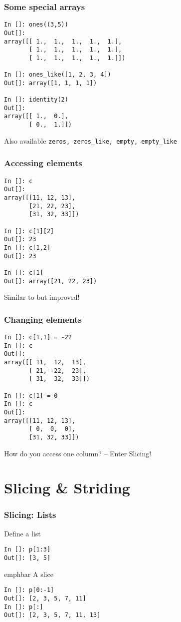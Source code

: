 \documentclass[14pt,compress]{beamer}
\newcommand{\emphbar}[1]
{\begin{beamercolorbox}[rounded=true]{emphbar} 
      {#1}
 \end{beamercolorbox}
}
\newcommand{\typ}[1]{\lstinline{#1}}
\newcommand{\kwrd}[1]{ \texttt{\textbf{\color{blue}{#1}}}  }
\begin{document}
\begin{frame}[fragile]
\frametitle{Some special arrays}
\begin{small}
  \begin{lstlisting}
In []: ones((3,5))
Out[]: 
array([[ 1.,  1.,  1.,  1.,  1.],
       [ 1.,  1.,  1.,  1.,  1.],
       [ 1.,  1.,  1.,  1.,  1.]])

In []: ones_like([1, 2, 3, 4]) 
Out[]: array([1, 1, 1, 1])   

In []: identity(2)
Out[]: 
array([[ 1.,  0.],
       [ 0.,  1.]])
  \end{lstlisting}
Also available \alert{\typ{zeros, zeros_like, empty, empty_like}}
\end{small}
\end{frame}


\begin{frame}[fragile]
  \frametitle{Accessing elements}
  \begin{small}
  \begin{lstlisting}
In []: c
Out[]: 
array([[11, 12, 13],
       [21, 22, 23],
       [31, 32, 33]])

In []: c[1][2]
Out[]: 23
In []: c[1,2]
Out[]: 23

In []: c[1]
Out[]: array([21, 22, 23])
  \end{lstlisting}
  \end{small}
Similar to \kwrd{lists} but improved!
\end{frame}

\begin{frame}[fragile]
  \frametitle{Changing elements}
  \begin{small}
  \begin{lstlisting}
In []: c[1,1] = -22
In []: c
Out[]: 
array([[ 11,  12,  13],
       [ 21, -22,  23],
       [ 31,  32,  33]])

In []: c[1] = 0
In []: c
Out[]: 
array([[11, 12, 13],
       [ 0,  0,  0],
       [31, 32, 33]])
  \end{lstlisting}
  \end{small}
How do you access one \alert{column}? -- Enter Slicing!
\end{frame}

\section{Slicing \& Striding}

\begin{frame}[fragile]
  \frametitle{Slicing: Lists}
  \begin{block}{Define a list}
	\kwrd{In []: p = [ 2, 3, 5, 7, 11, 13]}
  \end{block}
\begin{lstlisting}
In []: p[1:3]
Out[]: [3, 5]
\end{lstlisting}
\emphbar{A slice}
\begin{lstlisting}
In []: p[0:-1]
Out[]: [2, 3, 5, 7, 11]
In []: p[:]
Out[]: [2, 3, 5, 7, 11, 13]
\end{lstlisting}
\end{frame}
\end{document}
